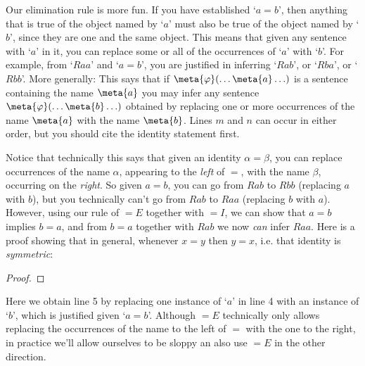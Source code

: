 Our elimination rule is more fun. If you have established `$a=b$', then anything that is true of the object named by `$a$' must also be true of the object named by `$b$', since they are one and the same object. This means that given any sentence with `$a$' in it, you can replace some or all of the occurrences of `$a$' with `$b$'. For example, from `$Raa$' and `$a = b$', you are justified in inferring `$Rab$', or `$Rba$', or `$Rbb$'. More generally:
This says that if $\meta{\varphi}(\ldots \meta{a} \ldots)$ is a sentence containing the name $\meta{a}$ you may infer any sentence $\meta{\varphi}(\ldots \meta{b} \ldots)$ obtained by replacing one or more occurrences of the name $\meta{a}$ with the name $\meta{b}$. Lines $m$ and $n$ can occur in either order, but you should cite the identity statement first.  

Notice that technically this says that given an identity $\alpha = \beta$, you can replace occurrences of the name $\alpha$, appearing to the \emph{left} of $=$, with the name $\beta$, occurring on the \emph{right}.  So given $a=b$, you can go from $Rab$ to $Rbb$ (replacing $a$ with $b$), but you technically can't go from $Rab$ to $Raa$ (replacing $b$ with $a$).  However, using our rule of $=E$ together with $=I$, we can  show that $a=b$ implies $b=a$, and from $b=a$ together with $Rab$ we now \emph{can} infer $Raa$.  Here is a proof showing that in general, whenever $x=y$ then $y=x$, i.e. that identity is \emph{symmetric}:

\begin{proof}
\open
	 \fl{}
	\open
		 \fl{}
		\open
			  
			 
			 
		\close
		 
	\close
	 
\close
{} 


\end{proof}
Here we obtain line 5 by replacing one instance of `$a$' in line 4 with an instance of `$b$', which is justified given `$a= b$'.  Although $=E$ technically only allows replacing the occurrences of the name to the left of $=$ with the one to the right, in practice we'll allow ourselves to be sloppy an also use $=E$ in the other direction.



